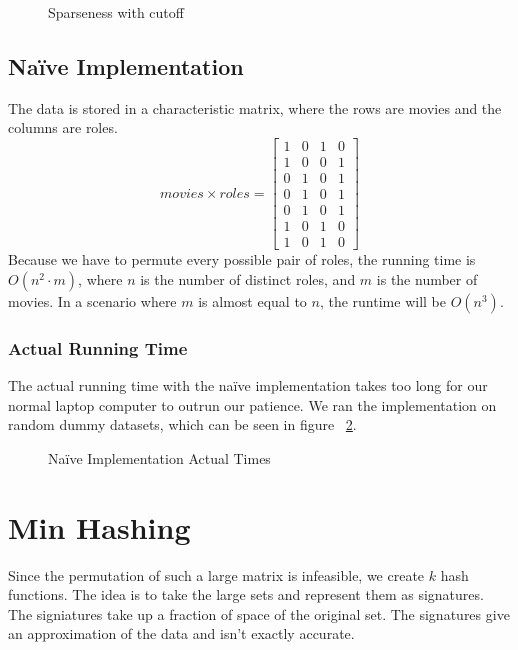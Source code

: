 \documentclass[a4paper,11pt]{article}
\begin{document}
\begin{figure}
    \begin{center}
        
        \caption{Sparseness with cutoff}
        \label{fig:sparsenesscutoff}
    \end{center}
\end{figure}

\subsection{Naïve Implementation}

The data is stored in a characteristic matrix, where the rows are movies and the columns are roles.
\begin{equation}
movies \times roles = 
\begin{bmatrix}
    1 & 0 & 1 & 0\\
    1 & 0 & 0 & 1\\
    0 & 1 & 0 & 1\\
    0 & 1 & 0 & 1\\
    0 & 1 & 0 & 1\\
    1 & 0 & 1 & 0\\
    1 & 0 & 1 & 0
\end{bmatrix}
\end{equation}
Because we have to permute every possible pair of roles, the running time is $O(n^2 \cdot m)$, where $n$ is the number of distinct roles, and $m$ is the number of movies. In a scenario where $m$ is almost equal to $n$, the runtime will be $O(n^3)$. \\

\subsubsection{Actual Running Time}
The actual running time with the naïve implementation takes too long for our normal laptop computer to outrun our patience. We ran the implementation on random dummy datasets, which can be seen in figure ~\ref{fig:naive_at}.

\begin{figure}
    \begin{center}
        
        \caption{Naïve Implementation Actual Times}
        \label{fig:naive_at}
    \end{center}
\end{figure}


\section{Min Hashing}
Since the permutation of such a large matrix is infeasible, we create $k$ hash functions. The idea is to take the large sets and represent them as signatures. The signiatures take up a fraction of space of the original set. The signatures give an approximation of the data and isn't exactly accurate.\\
\end{document}
